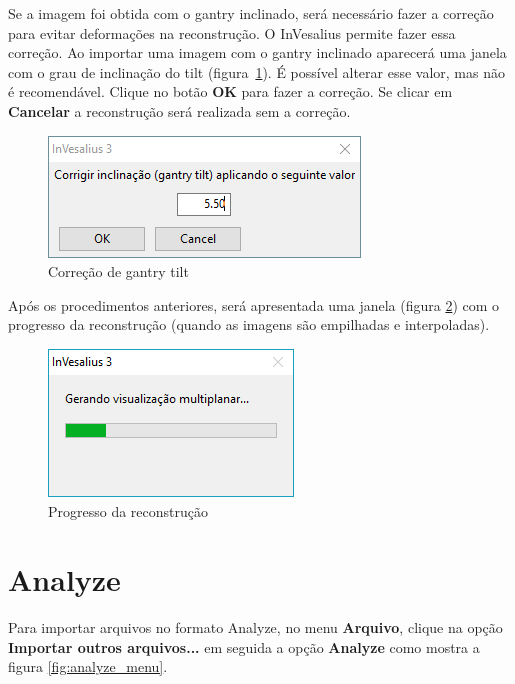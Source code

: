 Se a imagem foi obtida com o gantry inclinado, será necessário fazer a correção para evitar deformações na reconstrução. O InVesalius permite fazer essa correção. Ao importar uma imagem com o gantry inclinado aparecerá uma janela com o grau de inclinação do tilt (figura~\ref{fig:gantry_tilt}). É possível alterar esse valor, mas não é recomendável. Clique no botão \textbf{OK} para fazer a correção. Se clicar em \textbf{Cancelar} a reconstrução será realizada sem a correção.

\begin{figure}[!htb]
\centering
\includegraphics[scale=0.75]{../user_guide_figures/invesalius_screen/window_gantry_tilt_pt.png}
\caption{Correção de gantry tilt}
\label{fig:gantry_tilt}
\end{figure}

Após os procedimentos anteriores, será apresentada uma janela (figura \ref{fig:prog_recons}) com o progresso
da reconstrução (quando as imagens são empilhadas e interpoladas).

\begin{figure}[!htb]
\centering
\includegraphics[scale=0.6]{../user_guide_figures/invesalius_screen/import_window_progress.png} 
\caption{Progresso da reconstrução}
\label{fig:prog_recons}
\end{figure}

\newpage

\section{Analyze}

Para importar arquivos no formato Analyze, no menu \textbf{Arquivo}, clique na opção \textbf{Importar outros arquivos...} em seguida a opção \textbf{Analyze} como mostra a figura \ref{fig:analyze_menu}.

